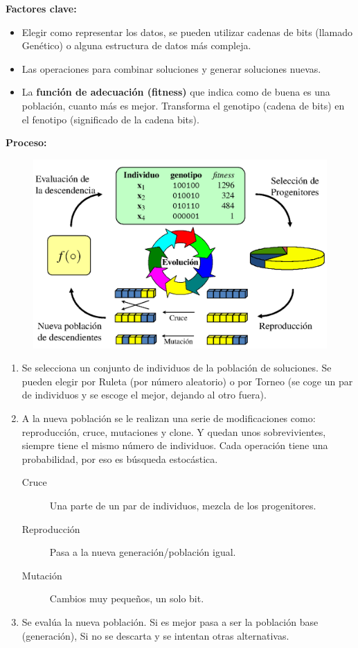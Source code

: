 \documentclass[12pt, twoside, openright]{report} %
\begin{document}
\textbf{Factores clave:}
\begin{itemize}
	\item Elegir como representar los datos, se pueden utilizar cadenas de bits (llamado Genético) o alguna estructura de datos más compleja.
	\item Las operaciones para combinar soluciones y generar soluciones nuevas.
	\item La \textbf{función de adecuación (fitness)} que indica como de buena es una población, cuanto más es mejor. Transforma el genotipo (cadena de bits) en el fenotipo (significado de la cadena bits).
\end{itemize}
\pagebreak
\textbf{Proceso:}
\begin{figure}[H]
	{\includegraphics[scale=.3]{2021-03-19 11_42_34-otras-tecnicas.pdf - Foxit Reader.png}}
\end{figure}
\begin{enumerate}
	\item Se selecciona un conjunto de individuos de la población de soluciones. Se pueden elegir por Ruleta (por número aleatorio) o por Torneo (se coge un par de individuos y se escoge el mejor, dejando al otro fuera).
	\item A la nueva población se le realizan una serie de modificaciones como: reproducción, cruce, mutaciones y clone. Y quedan unos sobrevivientes, siempre tiene el mismo número de individuos.
	      Cada operación tiene una probabilidad, por eso es búsqueda estocástica.
	      \begin{description}
		      \item[Cruce] Una parte de un par de individuos, mezcla de los progenitores.
		      \item[Reproducción] Pasa a la nueva generación/población igual.
		      \item[Mutación] Cambios muy pequeños, un solo bit.
	      \end{description}
	\item Se evalúa la nueva población. Si es mejor pasa a ser la población base (generación), Si no se descarta y se intentan otras alternativas.
\end{enumerate}
\end{document}
